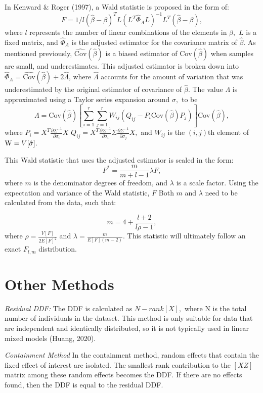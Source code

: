 \documentclass[12pt, twoside]{amherstthesis}
\begin{document}
In Kenward \& Roger (1997), a Wald statistic is proposed in the form of:
\[F = 1/l(\hat\beta-\beta)^TL(L^T\hat\Phi_A L)^{-1}L^T(\hat\beta-\beta),\] where \(l\) represents the number of linear combinations of the elements in \(\beta,\) \(L\) is a fixed matrix, and \(\hat\Phi_A\) is the adjusted estimator for the covariance matrix of \(\hat\beta\). As mentioned previously, \(\widehat {\text{Cov}}(\hat\beta)\) is a biased estimator of \(\text{Cov}(\hat\beta)\) when samples are small, and underestimates. This adjusted estimator is broken down into \(\hat\Phi_A = \widehat {\text {Cov}}(\hat\beta) + 2\hat\Lambda\), where \(\hat\Lambda\) accounts for the amount of variation that was underestimated by the original estimator of covariance of \(\hat\beta\). The value \(\Lambda\) is approximated using a Taylor series expansion around \(\sigma,\) to be \[\Lambda =\text{Cov}(\hat\beta)[\sum_{i=1}^{r}\sum_{j=1}^{r}W_{ij}(Q_{ij}-P_i\text{Cov}(\hat\beta)P_j)]\text{Cov}(\hat\beta),\] where
\(P_i = X^T\frac{\partial\Sigma^{-1}}{\partial\sigma_i}X\)
\(Q_{ij} = X^T \frac{\partial\Sigma^{-1}}{\partial\sigma_i}\Sigma\frac{\partial\Sigma^{-1}}{\partial\sigma_j}X,\) and \(W_{ij}\) is the \((i,j)\)th element of \(\text W = V[\hat\sigma].\)

This Wald statistic that uses the adjusted estimator is scaled in the form: \[F^* = \frac{m}{m+l-1}\lambda F,\] where \(m\) is the denominator degrees of freedom, and \(\lambda\) is a scale factor. Using the expectation and variance of the Wald statistic, \(F\) Both \(m\) and \(\lambda\) need to be calculated from the data, such that:

\[m = 4 + \frac{l+2}{l\rho-1},\] where \(\rho = \frac{V[F]}{2E[F]^2}\) and
\(\lambda = \frac{m}{E[F](m-2)}.\) This statistic will ultimately follow an exact \(F_{l,m}\) distribution.

\hypertarget{other-methods}{%
\section{Other Methods}\label{other-methods}}

\emph{Residual DDF:} The DDF is calculated as \(N-rank[X],\) where N is the total number of individuals in the dataset. This method is only suitable for data that are independent and identically distributed, so it is not typically used in linear mixed models (Huang, 2020).

\emph{Containment Method}
In the containment method, random effects that contain the fixed effect of interest are isolated. The smallest rank contribution to the \([X Z]\) matrix among these random effects becomes the DDF. If there are no effects found, then the DDF is equal to the residual DDF.
\end{document}
